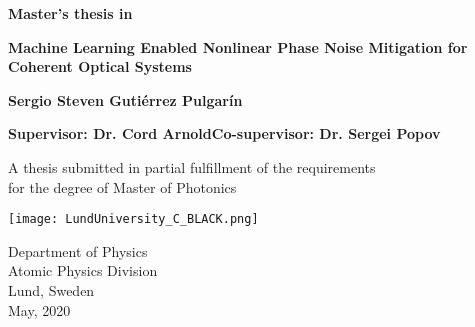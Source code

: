 
\setcounter{page}{1}

\newpage



\thispagestyle{empty}
\begin{center}
   \vspace*{1cm}
  {\large \textbf{Master's thesis in  }}

  \vspace*{0.5cm}
  {\LARGE \bf\noindent \textbf{Machine Learning Enabled Nonlinear Phase Noise Mitigation for Coherent Optical Systems  }}

  \vspace*{1cm}
  {\large\bf Sergio Steven Guti\'errez Pulgar\'in}
  
  \vspace*{0.30cm}
	{\normalsize \bf Supervisor: Dr. Cord Arnold\hfill   Co-supervisor: Dr. Sergei Popov}
	
  \vfill

  {\large A thesis submitted in partial fulfillment of the requirements\\
  [1mm] for the degree of Master of Photonics}
  \vspace*{0.9cm}
  
   \texttt{[image: LundUniversity\_C\_BLACK.png]}

  {\large Department of Physics \\
          [-1mm] Atomic Physics Division\\
          [-1mm] Lund, Sweden\\
          [1mm]  May, 2020}
%          
%	
%	


\end{center}

